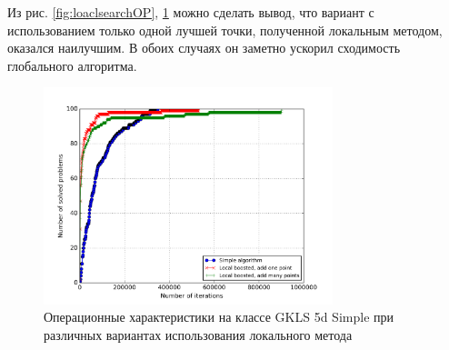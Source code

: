 Из рис. \ref{fig:loaclsearchOP}, \ref{fig:loaclsearchOP5d} можно сделать вывод, что вариант с использованием только одной лучшей точки, полученной локальным методом, оказался наилучшим.
В обоих случаях он заметно ускорил сходимость глобального алгоритма.
\begin{figure}[ht]
	\center
  \includegraphics[width=0.75\textwidth]{pictures/local_search_op5d.png}
  \caption{Операционные характеристики на классе GKLS 5d Simple при различных вариантах использования локального метода}
  \label{fig:loaclsearchOP5d}
\end{figure}

